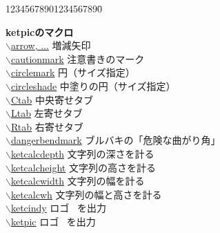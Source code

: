 \documentclass[a4j,12pt,dvipdfmx]{ujarticle}
\newcommand{\bs}{$\backslash$}
\begin{document}
\begin{tabbing}
12345678901234567890\=\kill

{\bf ketpicのマクロ} \> \\
\hyperlink{arrow of i or d}{\bs arrow, ...} \> 増減矢印\\
\hyperlink{cautionmark}{\bs cautionmark} \> 注意書きのマーク\\
\hyperlink{circlemark}{\bs circlemark} \> 円（サイズ指定）\\
\hyperlink{circleshade}{\bs circleshade} \> 中塗りの円（サイズ指定）\\
\hyperlink{tab}{\bs Ctab} \> 中央寄せタブ\\
\hyperlink{tab}{\bs Ltab} \> 左寄せタブ\\
\hyperlink{tab}{\bs Rtab} \> 右寄せタブ\\
\hyperlink{dangerbendmark}{\bs dangerbendmark} \> ブルバキの「危険な曲がり角」\\
\hyperlink{ketcalc}{\bs ketcalcdepth} \> 文字列の深さを計る\\
\hyperlink{ketcalc}{\bs ketcalcheight} \> 文字列の高さを計る\\
\hyperlink{ketcalc}{\bs ketcalcwidth} \> 文字列の幅を計る\\
\hyperlink{ketcalcwh}{\bs ketcalcwh} \> 文字列の幅と高さを計る\\
\hyperlink{ketcindy}{\bs ketcindy} \> ロゴ \ketcindy\ を出力\\
\hyperlink{ketpic}{\bs ketpic} \> ロゴ \ketpic\ を出力\\


\end{tabbing}
\end{document}
